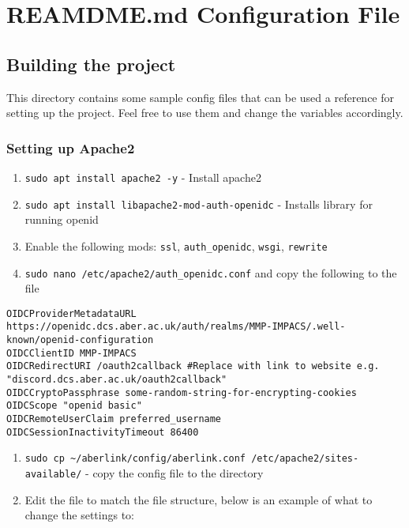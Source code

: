 \chapter{REAMDME.md Configuration File}

\section{Building the project}\label{building-the-project}

This directory contains some sample config files that can be used a
reference for setting up the project. Feel free to use them and change
the variables accordingly.

\subsection{Setting up Apache2}\label{setting-up-apache2}

\begin{enumerate}
\def\labelenumi{\arabic{enumi}.}
\item
  \texttt{sudo apt install apache2 -y} - Install apache2
\item
  \texttt{sudo apt install libapache2-mod-auth-openidc} - Installs
  library for running openid
\item
  Enable the following mods: \texttt{ssl}, \texttt{auth\_openidc},
  \texttt{wsgi}, \texttt{rewrite}
\item
  \texttt{sudo nano /etc/apache2/auth\_openidc.conf} and copy the
  following to the file
\end{enumerate}

\begin{lstlisting}
OIDCProviderMetadataURL https://openidc.dcs.aber.ac.uk/auth/realms/MMP-IMPACS/.well-known/openid-configuration
OIDCClientID MMP-IMPACS 
OIDCRedirectURI /oauth2callback #Replace with link to website e.g. "discord.dcs.aber.ac.uk/oauth2callback"
OIDCCryptoPassphrase some-random-string-for-encrypting-cookies
OIDCScope "openid basic"
OIDCRemoteUserClaim preferred_username
OIDCSessionInactivityTimeout 86400
\end{lstlisting}

\begin{enumerate}
\def\labelenumi{\arabic{enumi}.}
\setcounter{enumi}{4}
\item
  \texttt{sudo cp \textasciitilde{}/aberlink/config/aberlink.conf /etc/apache2/sites-available/}
  - copy the config file to the directory
\item
  Edit the file to match the file structure, below is an example of what
  to change the settings to:
\end{enumerate}

